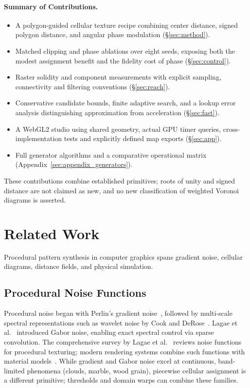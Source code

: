 \documentclass[sigconf,nonacm]{acmart}
\begin{document}
\paragraph{Summary of Contributions.}
\begin{itemize}
\item A polygon-guided cellular texture recipe combining center distance,
signed polygon distance, and angular phase modulation (\S\ref{sec:method}).
\item Matched clipping and phase ablations over eight seeds, exposing both
the modest assignment benefit and the fidelity cost of phase
(\S\ref{sec:control}).
\item Raster solidity and component measurements with explicit sampling,
connectivity and filtering conventions (\S\ref{sec:reach}).
\item Conservative candidate bounds, finite adaptive search, and a lookup
error analysis distinguishing approximation from acceleration
(\S\ref{sec:fast}).
\item A WebGL2 studio using shared geometry, actual GPU timer queries,
cross-implementation tests and explicitly defined map exports
(\S\ref{sec:app}).
\item Full generator algorithms and a comparative operational matrix
(Appendix~\ref{sec:appendix_generators}).
\end{itemize}
These contributions combine established primitives; roots of unity and signed
distance are not claimed as new, and no new classification of weighted
Voronoi diagrams is asserted.

\section{Related Work}
\label{sec:related}

Procedural pattern synthesis in computer graphics spans gradient noise, cellular
diagrams, distance fields, and physical simulation.

\subsection{Procedural Noise Functions}
Procedural noise began with Perlin's gradient noise~\cite{perlin1985}, followed
by multi-scale spectral representations such as wavelet noise by Cook and
DeRose~\cite{cook2005wavelet}. Lagae et al.~\cite{lagae2009gabor} introduced Gabor
noise, enabling exact spectral control via sparse convolution. The comprehensive
survey by Lagae et al.~\cite{lagae2010noise} reviews noise functions for procedural texturing; modern rendering systems combine such functions with material models~\cite{pbr4}. While gradient
and Gabor noise excel at continuous, band-limited phenomena (clouds, marble, wood
grain), piecewise cellular assignment is a different primitive; thresholds and
domain warps can combine these families.
\end{document}
